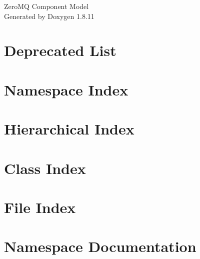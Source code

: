 \documentclass[twoside]{book}
\newcommand{\+}{\discretionary{\mbox{\scriptsize$\hookleftarrow$}}{}{}}
\newcommand{\clearemptydoublepage}{%
  \newpage{\pagestyle{empty}\cleardoublepage}%
}
\begin{document}
\hypersetup{pageanchor=false,
             bookmarksnumbered=true,
             pdfencoding=unicode
            }
\begin{titlepage}
\vspace*{7cm}
\begin{center}%
{\Large Zero\+MQ Component Model }\\
\vspace*{1cm}
{\large Generated by Doxygen 1.8.11}\\
\end{center}
\end{titlepage}
\clearemptydoublepage
\tableofcontents
\clearemptydoublepage
{}
\hypersetup{pageanchor=true}

\chapter{Deprecated List}
\label{deprecated}
\hypertarget{deprecated}{}

\chapter{Namespace Index}

\chapter{Hierarchical Index}

\chapter{Class Index}

\chapter{File Index}

\chapter{Namespace Documentation}



\end{document}
